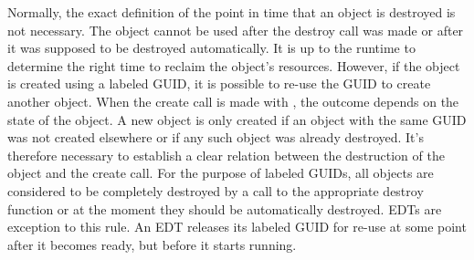 Normally, the exact definition of the point in time that an object is
destroyed is not necessary. The object cannot be used after the
destroy call was made or after it was supposed to be destroyed
automatically. It is up to the runtime to determine the right time to
reclaim the object's resources. However, if the object is created using
a labeled GUID, it is possible to re-use the GUID to create another
object. When the create call is made with ,
the outcome depends on the state of the object. A new object is only
created if an object with the same GUID was not created elsewhere
or if any such object was already destroyed. It's therefore necessary
to establish a clear relation between the destruction of the object
and the create call. For the purpose of labeled GUIDs, all objects are
considered to be completely destroyed by a call to the appropriate
destroy function or at the moment they should be automatically
destroyed. EDTs are exception to this rule. An EDT releases its
labeled GUID for re-use at some point after it becomes ready, but
before it starts running.
